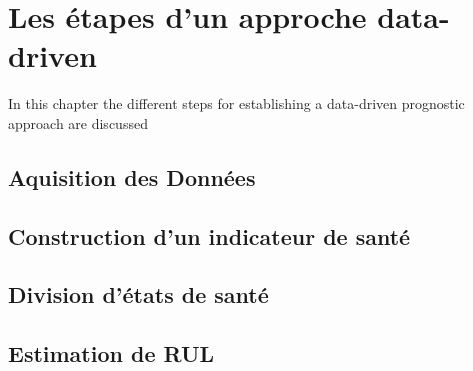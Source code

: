 \chapter{Les étapes d'un approche data-driven}
\begin{chapterintro}
    In this chapter the different steps for establishing a data-driven prognostic approach are discussed
\end{chapterintro}

\section{Aquisition des Données}
\section{Construction d'un indicateur de santé}
\section{Division d'états de santé}
\section{Estimation de RUL}
